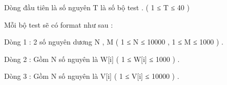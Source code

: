 Dòng đầu tiên là số nguyên T là số bộ test . ( 1 ≤ T ≤ 40 )


Mỗi bộ test sẽ có format như sau :


Dòng 1 : 2 số nguyên dương N , M ( 1 ≤ N ≤ 10000 , 1 ≤ M ≤ 1000 ) .


Dòng 2 : Gồm N số nguyên là W[i] ( 1 ≤ W[i] ≤ 1000 ) .


Dòng 3 : Gồm N số nguyên là V[i] ( 1 ≤ V[i] ≤ 10000 ) .